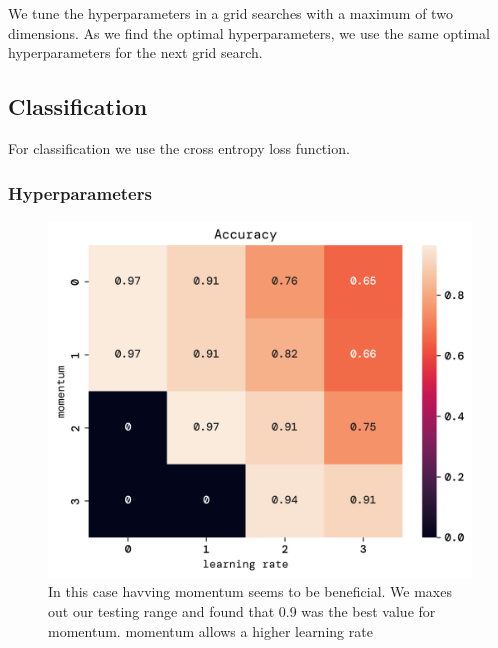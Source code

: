 \documentclass[twoside,11pt]{report}
\begin{document}
We tune the hyperparameters in a grid searches with a maximum
of two dimensions. As we find the optimal hyperparameters, we use the same optimal hyperparameters for the next grid search.

\subsection{Classification}
\label{sec:classification}

For classification we use the cross entropy loss function. 

\subsubsection{Hyperparameters}
\label{sec:hyperparameters}


\begin{figure}[!ht]
    \begin{minipage}[t]{0.49\textwidth}
    \begin{center}
        \includegraphics[width=\textwidth]{../runsAndFigures/accuracy_lr_gamma.png}
    \end{center}
    \caption{In this case havving momentum seems to be beneficial. We maxes out our testing range and found that 0.9 was the best value for momentum. momentum allows a higher learning rate}\label{fig:accuracy_lr_gamma}
\end{minipage}
\hspace{2mm}
\begin{minipage}[t]{0.49\textwidth}

\end{minipage}
\end{figure}
\end{document}
